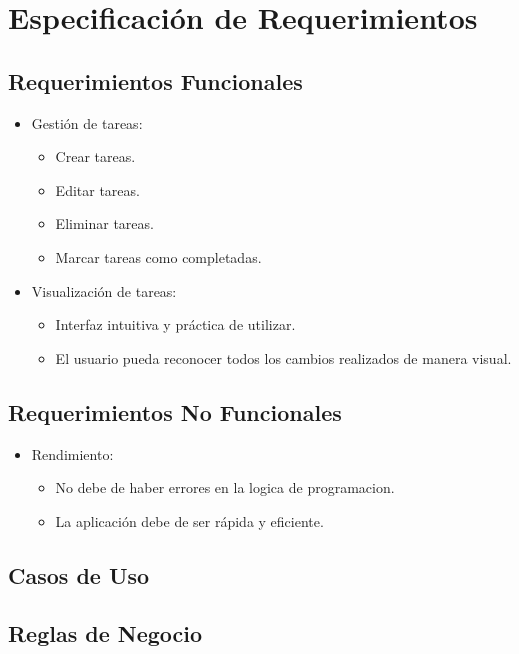 	\chapter{Especificación de Requerimientos}
	\section{Requerimientos Funcionales}
    \begin{itemize}
        \item Gestión de tareas:
        \begin{itemize}
            \item Crear tareas.
            \item Editar tareas.
            \item Eliminar tareas.
            \item Marcar tareas como completadas.
        \end{itemize}
        \item Visualización de tareas:
        \begin{itemize}
            \item Interfaz intuitiva y práctica de utilizar.
            \item El usuario pueda reconocer todos los cambios realizados de manera visual.
        \end{itemize}
    \end{itemize}
	
	\section{Requerimientos No Funcionales}
	\begin{itemize}
        \item Rendimiento:
        \begin{itemize}
            \item No debe de haber errores en la logica de programacion.
            \item La aplicación debe de ser rápida y eficiente.
        \end{itemize}
    \end{itemize}
	
	\section{Casos de Uso}
	

    \section{Reglas de Negocio}
    

